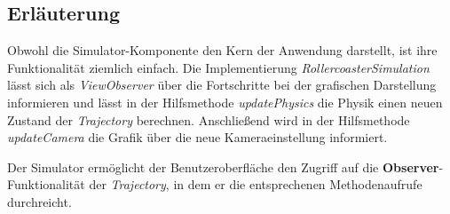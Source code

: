 \subsection{Erläuterung}

Obwohl die Simulator-Komponente den Kern der Anwendung darstellt, ist ihre Funktionalität
ziemlich einfach. Die Implementierung \emph{RollercoasterSimulation} lässt sich als
\emph{ViewObserver} über die Fortschritte bei der grafischen Darstellung informieren
und lässt in der Hilfsmethode \emph{updatePhysics} die Physik einen neuen Zustand 
der \emph{Trajectory} berechnen. Anschließend wird in der Hilfsmethode \emph{updateCamera}
die Grafik über die neue Kameraeinstellung informiert.

Der Simulator ermöglicht der Benutzeroberfläche den Zugriff auf die \textbf{Observer}-
Funktionalität der \emph{Trajectory}, in dem er die entsprechenen Methodenaufrufe durchreicht.
